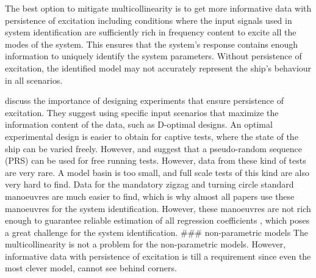 The best option to mitigate multicollinearity is to get more informative data with persistence of excitation including conditions where the input signals used in system identification are sufficiently rich in frequency content to excite all the modes of the system. This ensures that the system's response contains enough information to uniquely identify the system parameters. Without persistence of excitation, the identified model may not accurately represent the ship's behaviour in all scenarios.

\cite{yoonIdentificationHydrodynamicCoefficients2003} discuss the importance of designing experiments that ensure persistence of excitation. They suggest using specific input scenarios that maximize the information content of the data, such as D-optimal designs. An optimal experimental design is easier to obtain for captive tests, where the state of the ship can be varied freely. However, \cite{wangOptimalDesignExcitation2020} and  \cite{millerShipModelIdentification2021} suggest that a pseudo-random sequence (PRS) can be used for free running tests.  However, data from these kind of tests are very rare. A model basin is too small, and full scale tests of this kind are also very hard to find. 
Data for the mandatory zigzag and turning circle standard manoeuvres \cite{imoStandardsShipManoeuvrability2002} are much easier to find, which is why almost all papers use these manoeuvres for the system identification. However, these manoeuvres are not rich enough to guarantee reliable estimation of all regression coefficients \cite{sutuloAlgorithmOfflineIdentification2014}, which poses a great challenge for the system identification.
### non-parametric models
The multicollinearity is not a problem for the non-parametric models. However, informative data with persistence of excitation is till a requirement since even the most clever model, cannot see behind corners. 